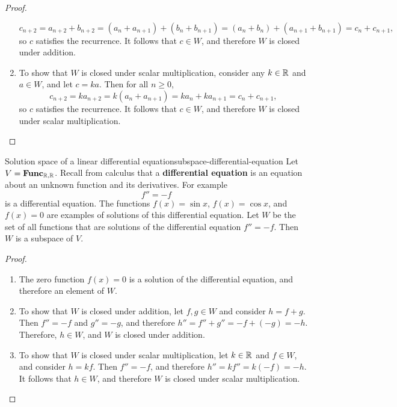 \begin{proof}
\begin{enumerate}
\begin{equation*}
      c_{n+2}
      = a_{n+2} + b_{n+2}
      = (a_n + a_{n+1}) + (b_n + b_{n+1})
      = (a_n + b_n) + (a_{n+1} + b_{n+1})
      = c_n + c_{n+1},
    \end{equation*}
    so $c$ satisfies the recurrence. It follows that $c\in W$, and
    therefore $W$ is closed under addition.
  \item To show that $W$ is closed under scalar multiplication,
    consider any $k\in\mathbb{R}$ and $a\in W$, and let $c=ka$. Then for all
    $n\geq 0$,
    \begin{equation*}
      c_{n+2}
      = ka_{n+2}
      = k(a_n + a_{n+1})
      = ka_n + ka_{n+1}
      = c_n + c_{n+1},
    \end{equation*}
    so $c$ satisfies the recurrence. It follows that $c\in W$, and
    therefore $W$ is closed under scalar multiplication.
  \end{enumerate}
\end{proof}

\begin{example}{Solution space of a linear differential equation}{subspace-differential-equation}
  Let $V=\mathbf{Func}_{\mathbb{R},\mathbb{R}}$. Recall from calculus that a
  \textbf{differential equation}%
   is an equation about an unknown
  function and its derivatives. For example
  \begin{equation*}
    f'' = -f
  \end{equation*}
  is a differential equation. The functions $f(x)=\sin x$,
  $f(x)=\cos x$, and $f(x)=0$ are examples of solutions of this
  differential equation.  Let $W$ be the set of all functions that are
  solutions of the differential equation $f'' = -f$. Then $W$ is a
  subspace of\/ $V$.
\end{example}

\begin{proof}
  \begin{enumerate}
  \item The zero function $f(x)=0$ is a solution of the differential
    equation, and therefore an element of\/ $W$.
  \item To show that $W$ is closed under addition, let $f,g\in W$ and
    consider $h=f+g$. Then $f''=-f$ and $g''=-g$, and therefore
    $h'' = f'' + g'' = -f+(-g) = -h$. Therefore, $h\in W$, and $W$ is
    closed under addition.
  \item To show that $W$ is closed under scalar multiplication, let
    $k\in\mathbb{R}$ and $f\in W$, and consider $h=kf$. Then $f''=-f$, and
    therefore $h'' = kf'' = k(-f) = -h$. It follows that $h\in W$, and
    therefore $W$ is closed under scalar multiplication.
  \end{enumerate}
\end{proof}

